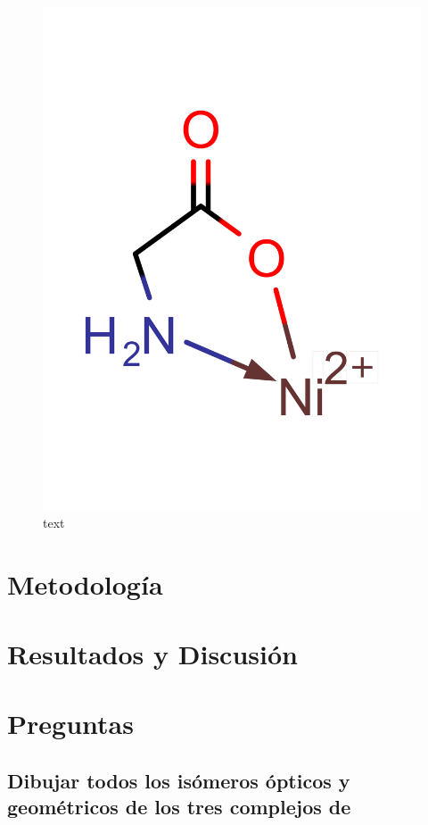 \documentclass[fleqn,10pt]{SelfArx} %
\begin{document}
    \begin{figure}[h]
    	\centering
    	\includegraphics[width=\linewidth]{images/Coordinated}
    	\caption{text}
    	\label{fig:coordinated}
    \end{figure}
	\section{Metodolog\'ia}

	\section{Resultados y Discusi\'on}
	
	\section{Preguntas}
	\subsection{Dibujar todos los is\'omeros \'opticos y geom\'etricos de los tres complejos de}
\end{document}
